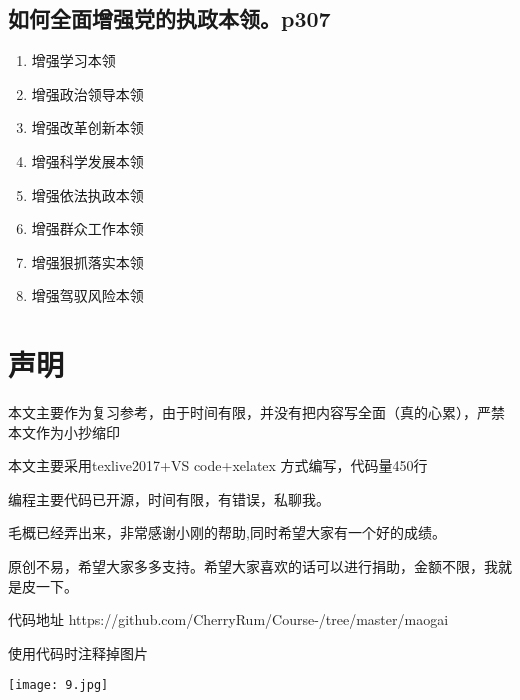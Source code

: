 \documentclass[UTF8]{ctexart}
\begin{document}
\subsection{如何全面增强党的执政本领。p307}
\begin{enumerate}[(1)]
    \item 增强学习本领
    \item 增强政治领导本领
    \item 增强改革创新本领
    \item 增强科学发展本领
    \item 增强依法执政本领
    \item 增强群众工作本领
    \item 增强狠抓落实本领
    \item 增强驾驭风险本领
\end{enumerate}
\clearpage 
\section*{声明}
\par  本文主要作为复习参考，由于时间有限，并没有把内容写全面（真的心累），严禁本文作为小抄缩印
\par  本文主要采用texlive2017+VS code+xelatex 方式编写，代码量450行
\par  编程主要代码已开源，时间有限，有错误，私聊我。
\par  毛概已经弄出来，非常感谢小刚的帮助,同时希望大家有一个好的成绩。
\par  原创不易，希望大家多多支持。希望大家喜欢的话可以进行捐助，金额不限，我就是皮一下。
\par  代码地址  https://github.com/CherryRum/Course-/tree/master/maogai  
\par  使用代码时注释掉图片
\centerline{\texttt{[image: 9.jpg]}}
\end{document}
